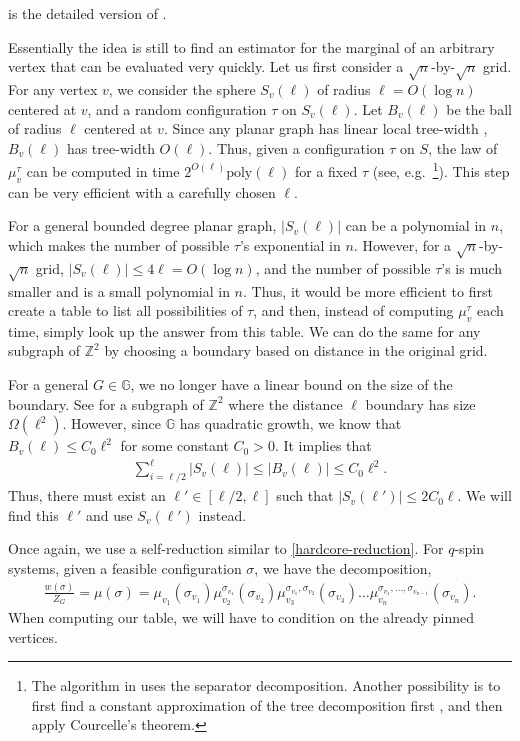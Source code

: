 \documentclass{theoretics}
\def\=#1{\mathbb{#1}}
\newcommand{\abs}[1]{\ensuremath{\left\vert#1\right\vert}}
\begin{document}
 is the detailed version of .

Essentially the idea is still to find an estimator for the marginal of an arbitrary vertex that can be evaluated very quickly.
Let us first consider a $\sqrt{n}$-by-$\sqrt{n}$ grid.
For any vertex $v$, we consider the sphere $S_v(\ell)$ of radius $\ell=O(\log n)$ centered at $v$,
and a random configuration $\tau$ on $S_v(\ell)$.
Let $B_v(\ell)$ be the ball of radius $\ell$ centered at $v$.
Since any planar graph has linear local tree-width \cite{DH04,Epp00},
$B_v(\ell)$ has tree-width $O(\ell)$.
Thus, given a configuration $\tau$ on $S$, 
the law of $\mu_v^{\tau}$ can be computed in time $2^{O(\ell)}\textrm{poly}(\ell)$ for a fixed $\tau$ (see, e.g.~\cite{YZ13}\footnote{The algorithm in \cite{YZ13} uses the separator decomposition. Another possibility is to first find a constant approximation of the tree decomposition first \cite{KT16}, and then apply Courcelle's theorem.}).
This step can be very efficient with a carefully chosen $\ell$.

For a general bounded degree planar graph, $\abs{S_v(\ell)}$ can be a polynomial in $n$, which makes the number of possible $\tau$'s exponential in $n$.
However, for a $\sqrt{n}$-by-$\sqrt{n}$ grid, $\abs{S_v(\ell)}\le 4\ell=O(\log n)$,
and the number of possible $\tau$'s is much smaller and is a small polynomial in $n$.
Thus, it would be more efficient to first create a table to list all possibilities of $\tau$,
and then, instead of computing $\mu_v^{\tau}$ each time,
 simply look up the answer from this table. We can do the same for any subgraph of $\mathbb{Z}^2$ by choosing a boundary based on distance in the original grid. 

For a general $G\in\=G$,
we no longer have a linear bound on the size of the boundary.
See  for a subgraph of $\=Z^2$ where the distance $\ell$ boundary has size $\Omega(\ell^2)$.
However, since $\=G$ has quadratic growth,
we know that $B_v(\ell)\le C_0\ell^2$ for some constant $C_0>0$.
It implies that 
\begin{align*}
  \sum_{i=\ell/2}^{\ell}\abs{S_v(\ell)}\le\abs{B_v(\ell)} \le C_0\ell^2.
\end{align*}
Thus, there must exist an $\ell'\in[\ell/2,\ell]$ such that $\abs{S_v(\ell')}\le 2C_0\ell$.
We will find this $\ell'$ and use $S_v(\ell')$ instead.


Once again, we use a self-reduction similar to \eqref{hardcore-reduction}. For $q$-spin systems, given a feasible configuration $\sigma$, we have the decomposition,
\begin{align}
	\label{q-spin-decomposition}
	\frac{w(\sigma)}{Z_G}=\mu(\sigma)=\mu_{v_1}(\sigma_{v_1})\mu_{v_2}^{\sigma_{v_1}}(\sigma_{v_2})\mu_{v_3}^{\sigma_{v_1},\sigma_{v_2}}(\sigma_{v_3})\ldots\mu_{v_n}^{\sigma_{v_1},\ldots,\sigma_{v_{n-1}}}(\sigma_{v_n}).
\end{align}
When computing our table, we will have to condition on the already pinned vertices. 
\end{document}
